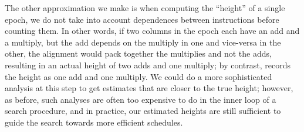 The other approximation we make is when computing the ``height'' of a single epoch, we do not take into account dependences between instructions before counting them. 
In other words, if two columns in the epoch each have an add and a multiply, but the add depends on the multiply in one and vice-versa in the other, the alignment would pack together the multiplies and not the adds, resulting in an actual height of two adds and one multiply; by contrast, \system records the height as one add and one multiply.
We could do a more sophisticated analysis at this step to get estimates that are closer to the true height; however, as before, such analyses are often too expensive to do in the inner loop of a search procedure, and in practice, our estimated heights are still sufficient to guide the search towards more efficient schedules. 




